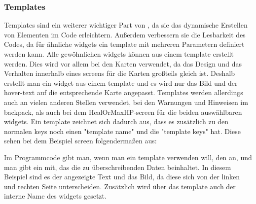\subsubsection{Templates}\label{sec:templates}
\renewcommand{\kapitelautor}{Autor: Felix Zwickelstorfer}
Templates sind ein weiterer wichtiger Part von \FF, da sie das dynamische Erstellen von Elementen im Code erleichtern.
Außerdem verbessern sie die Lesbarkeit des Codes, da für ähnliche widgets ein template mit mehreren Parametern definiert werden kann.
Alle gewöhnlichen widgets können aus einem template erstellt werden.
Dies wird vor allem bei den Karten verwendet, da das Design und das Verhalten innerhalb eines screens für die Karten großteils gleich ist.
Deshalb erstellt man ein widget aus einem template und es wird nur das Bild und der hover-text auf die entsprechende Karte angepasst.
Templates werden allerdings auch an vielen anderen Stellen verwendet, \zB bei den Warnungen und Hinweisen im backpack, als auch bei dem HealOrMaxHP-screen für die beiden auswählbaren widgets.
Ein template zeichnet sich dadurch aus, dass es zusätzlich zu den normalen keys noch einen "template name" und die "template keys" hat.
Diese sehen bei dem Beispiel screen folgendermaßen aus:
Im Programmcode gibt man, wenn man ein template verwenden will, den  an, und man gibt ein  mit, das die zu überschreibenden Daten beinhaltet.
In diesem Beispiel sind es der angezeigte Text und das Bild, da diese sich von der linken und rechten Seite unterscheiden.
Zusätzlich wird über das template auch der interne Name des widgets gesetzt.
